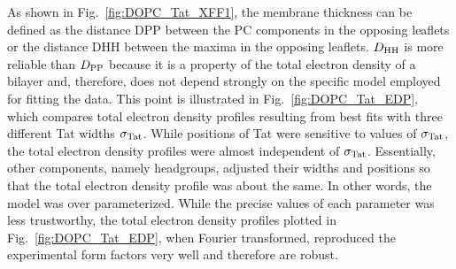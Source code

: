 As shown in Fig.~\ref{fig:DOPC_Tat_XFF1}, the membrane thickness can be defined
as the distance \gls{DPP} between the PC components in the opposing leaflets
or the distance \gls{DHH} between the maxima in the opposing leaflets. $D_\textrm{HH}$
is more reliable than $D_\textrm{PP}$ because it is a property of the total 
electron density of a bilayer and, therefore, does not depend strongly on the 
specific model employed for fitting the data. 
This point is illustrated in Fig.~\ref{fig:DOPC_Tat_EDP}, which compares total electron
density profiles resulting from best fits with three different Tat widths $\sigma_\textrm{Tat}$.
While positions of Tat were sensitive to values of $\sigma_\textrm{Tat}$, the total 
electron density profiles were almost independent of $\sigma_\textrm{Tat}$. Essentially,
other components, namely headgroups, adjusted their widths and positions so that
the total electron density profile was about the same.  In other words,
the model was over parameterized.
While the precise values of each parameter was less trustworthy,
the total electron density profiles plotted in Fig.~\ref{fig:DOPC_Tat_EDP},
when Fourier transformed, reproduced the experimental form factors very well
and therefore are robust. 

